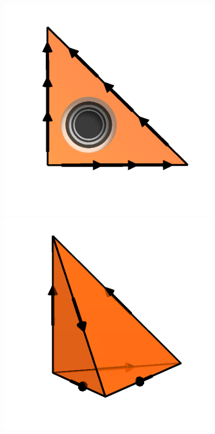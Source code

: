 \begin{figure}
  \includegraphics[width=\threefigs]{chapters/kirby-6/png/NED1_3_2d.png} \\
  \includegraphics[width=\threefigs]{chapters/kirby-6/png/NED1_1_3d.png}

\end{figure}
